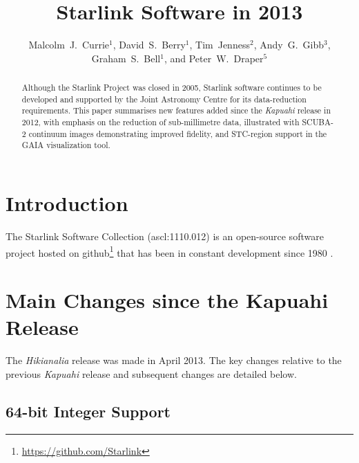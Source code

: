 \documentclass[11pt,twoside]{article}
\begin{document}
\title{Starlink Software in 2013}
\author{Malcolm~J.~Currie$^1$, David~S.~Berry$^1$, Tim~Jenness$^2$,
Andy~G.~Gibb$^3$, Graham~S.~Bell$^1$, and Peter~W.~Draper$^5$
}

\begin{abstract}
  Although the Starlink Project was closed in 2005, Starlink software
  continues to be developed and supported by the Joint Astronomy
  Centre for its data-reduction requirements. This paper summarises
  new features added since the \textit{Kapuahi} release in 2012, with
  emphasis on the reduction of sub-millimetre data, illustrated with
  SCUBA-2 continuum images demonstrating improved fidelity, and
  STC-region support in the GAIA visualization tool.
\end{abstract}

\section{Introduction}

The Starlink Software Collection (ascl:1110.012) is an open-source software project
hosted on github\footnote{\url{https://github.com/Starlink}} that has
been in constant development since 1980 \citep{1982QJRAS..23..485D}.

\section{Main Changes since the Kapuahi Release}

The \textit{Hikianalia} release was made in April 2013. The key
changes relative to the previous \textit{Kapuahi} release
\citep{2013ASPC..475..247B} and subsequent changes are detailed below.

\subsection*{64-bit Integer Support}
\end{document}
